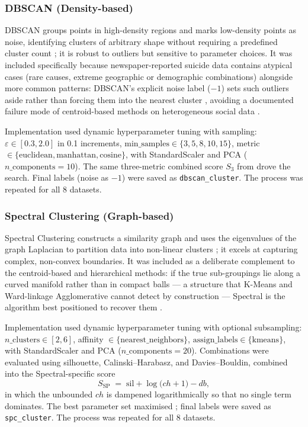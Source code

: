 \subsubsection{DBSCAN (Density-based)}

DBSCAN groups points in high-density regions and marks low-density points as noise, identifying clusters of arbitrary shape without requiring a predefined cluster count \cite{ref15}; it is robust to outliers but sensitive to parameter choices. It was included specifically because newspaper-reported suicide data contains atypical cases (rare causes, extreme geographic or demographic combinations) alongside more common patterns: DBSCAN's explicit noise label ($-1$) sets such outliers aside rather than forcing them into the nearest cluster \cite{ref15}, avoiding a documented failure mode of centroid-based methods on heterogeneous social data \cite{ref49}.

Implementation used dynamic hyperparameter tuning with sampling: $\varepsilon \in [0.3, 2.0]$ in 0.1 increments, $\mathrm{min\_samples} \in \{3, 5, 8, 10, 15\}$, metric $\in \{\text{euclidean}, \text{manhattan}, \text{cosine}\}$, with StandardScaler and PCA ($n\_\mathrm{components}=10$). The same three-metric combined score $S_3$ from  drove the search. Final labels (noise as $-1$) were saved as \texttt{dbscan\_cluster}. The process was repeated for all 8 datasets.

\subsubsection{Spectral Clustering (Graph-based)}

Spectral Clustering constructs a similarity graph and uses the eigenvalues of the graph Laplacian to partition data into non-linear clusters \cite{ref16}; it excels at capturing complex, non-convex boundaries. It was included as a deliberate complement to the centroid-based and hierarchical methods: if the true sub-groupings lie along a curved manifold rather than in compact balls --- a structure that K-Means and Ward-linkage Agglomerative cannot detect by construction --- Spectral is the algorithm best positioned to recover them \cite{ref16, ref49}.

Implementation used dynamic hyperparameter tuning with optional subsampling: $n\_\mathrm{clusters} \in [2, 6]$, affinity $\in \{\text{nearest\_neighbors}\}$, $\mathrm{assign\_labels} \in \{\text{kmeans}\}$, with StandardScaler and PCA ($n\_\mathrm{components}=20$). Combinations were evaluated using silhouette, Calinski--Harabasz, and Davies--Bouldin, combined into the Spectral-specific score
\begin{equation}\label{eq:tuning_score_spectral}
S_{\mathrm{SP}} \;=\; \text{sil} + \log\!\bigl(ch + 1\bigr) - db,
\end{equation}
in which the unbounded $ch$ is dampened logarithmically so that no single term dominates. The best parameter set maximised ; final labels were saved as \texttt{spc\_cluster}. The process was repeated for all 8 datasets.

